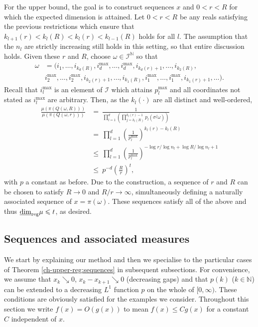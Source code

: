 For the upper bound, the goal is to construct sequences $x$ and $0 < r < R$ for which the expected dimension is attained. Let $0<r<R$ be any reals satisfying the previous restrictions which ensure that $ k_{l+1}(r)< k_l(R) < k_l(r) < k_{l-1}(R)$ holds for all $l$. The assumption that the $n_l$ are strictly increasing still holds in this setting, so that entire discussion holds. Given these $r$ and $R$, choose $\omega \in \mathcal{I}^\mathbb{N}$ so that 
\begin{align*} 
\omega&= (i_1,\ldots, i_{k_d(R)}, i_d^{\text{max}},\ldots, i_d^{\text{max}}, i_{k_d(r)+1},\ldots, i_{k_2(R)},\\
&i_2^{\text{max}},\ldots , i_2^{\text{max}}, i_{k_2(r)+1},\ldots, i_{k_1(R)}, i_1^{\text{max}}, \ldots, i_1^{\text{max}}, i_{k_1(r)+1},\ldots).
\end{align*}
Recall that $i_l^{\text{max}}$ is an element of $\mathcal{I}$ which attains $p_l^{\text{max}}$ and all coordinates not stated as $i_l^{\text{max}}$ are arbitrary. Then, as the $k_l(\cdot)$ are all distinct and well-ordered,
\begin{align*}
\frac{\mu(\pi(Q(\omega,R)))}{\mu(\pi(Q(\omega,r)))}  & =\ \frac{1}{\prod_{l=1}^d\left(\prod_{j=k_l(R)}^{k_l(r)-1}p_l(\sigma^j \omega) \right)} \\
& = \ \prod_{l=1}^d\left( \frac{1}{p_l^{\text{max}}}\right)^{k_l(r)-k_l(R)}  \\
& \le\ \prod_{l=1}^d \left( \frac{1}{p_l^{\text{max}}}\right)^{-\log r/\log n_l + \log R/\log n_l + 1}  \\
& \le \ p^{-d} \left( \frac{R}{r} \right)^{t},
\end{align*}
with $p$ a constant as before. Due to the construction, a sequence of $r$ and $R$ can be chosen to satisfy $R \rightarrow 0$ and $R/r \rightarrow \infty$, simultaneously defining a naturally associated sequence of $x = \pi(\omega)$. These sequences satisfy all of the above and thus $\underline{\dim}_{\textup{reg}} \mu \leqslant t$, as desired.




\subsection{Sequences and associated measures}\label{ch-upper-reg:sequenceproof}



We start by explaining our method and then we specialise to the particular cases of  Theorem \ref{ch-upper-reg:sequences} in subsequent subsections.  For convenience, we assume that $x_k \searrow 0$, $x_k-x_{k+1} \searrow 0$ (decreasing gaps) and that $p(k)$ ($k \in \mathbb{N}$) can be extended to a decreasing $L^1$ function $p$ on the whole of $[0,\infty)$.  These conditions are obviously satisfied for the  examples we consider.  Throughout this section we write $f(x)=O(g(x))$ to mean $f(x) \le Cg(x)$ for a constant $C$ independent of $x$.


